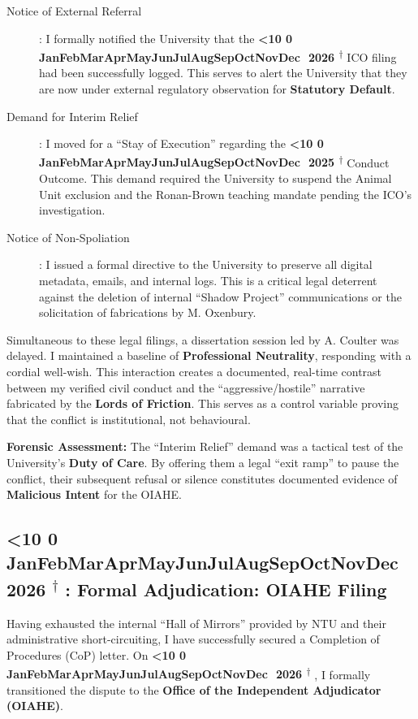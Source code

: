 \documentclass{EMBASSY}
\DeclareRobustCommand{\gmt}[3]{%
    \texorpdfstring{%
        {\color{DateGold}\textbf{%
            \ifnum#1<10 0\fi#1\,\textperiodcentered\,%
            \ifcase#2\or Jan\or Feb\or Mar\or Apr\or May\or Jun\or Jul\or Aug\or Sep\or Oct\or Nov\or Dec\fi
            \,\textperiodcentered\,20#3%
            \textsuperscript{$\dagger$}%
        }}%
    }{%
        (#1/#2/#3)%
    }%
}
\begin{document}
\begin{description}
	\item[Notice of External Referral]: I formally notified the University that the \gmt{18}{1}{26} ICO filing had been successfully logged. This serves to alert the University that they are now under external regulatory observation for \textbf{Statutory Default}.
	\item[Demand for Interim Relief]: I moved for a ``Stay of Execution'' regarding the \gmt{8}{12}{25} Conduct Outcome. This demand required the University to suspend the Animal Unit exclusion and the Ronan-Brown teaching mandate pending the ICO’s investigation.
	\item[Notice of Non-Spoliation]: I issued a formal directive to the University to preserve all digital metadata, emails, and internal logs. This is a critical legal deterrent against the deletion of internal ``Shadow Project'' communications or the solicitation of fabrications by M. Oxenbury.
\end{description}

\noindent Simultaneous to these legal filings, a dissertation session led by A. Coulter was delayed. I maintained a baseline of \textbf{Professional Neutrality}, responding with a cordial well-wish. This interaction creates a documented, real-time contrast between my verified civil conduct and the ``aggressive/hostile'' narrative fabricated by the \textbf{Lords of Friction}. This serves as a control variable proving that the conflict is institutional, not behavioural.

\textbf{Forensic Assessment:} The ``Interim Relief'' demand was a tactical test of the University's \textbf{Duty of Care}. By offering them a legal ``exit ramp'' to pause the conflict, their subsequent refusal or silence constitutes documented evidence of \textbf{Malicious Intent} for the OIAHE.

\subsection{\gmt{22}{1}{26}: Formal Adjudication: OIAHE Filing}
Having exhausted the internal ``Hall of Mirrors'' provided by NTU and their administrative short-circuiting, I have successfully secured a Completion of Procedures (CoP) letter. On \gmt{22}{1}{26}, I formally transitioned the dispute to the \textbf{Office of the Independent Adjudicator (OIAHE)}.
\end{document}
